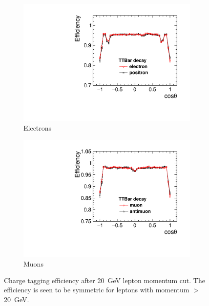 \begin{figure}
  \centering
  \begin{subfigure}{.5\textwidth}
    \centering
    \includegraphics[width=0.99\textwidth]{TopAnalysis/figures/ElectronEfficiencys_20GeVMCCut.pdf}
    \caption[Charge Tagging Efficiency]{Electrons}
  \end{subfigure}%
  \begin{subfigure}{.5\textwidth}
    \centering
    \includegraphics[width=0.99\textwidth]{TopAnalysis/figures/MuonEfficiencys_20GeVMCCut.pdf}
    \caption[Charge Tagging Efficiency]{Muons}
  \end{subfigure}
  \caption[Charge Tagging Efficiency After 20 GeV Lepton Momentum Cut]{Charge tagging efficiency after 20~GeV lepton momentum cut. The efficiency is seen to be symmetric for leptons with momentum $>$ 20~GeV.}
  \label{fig:effienciesWithCuts}
\end{figure}


